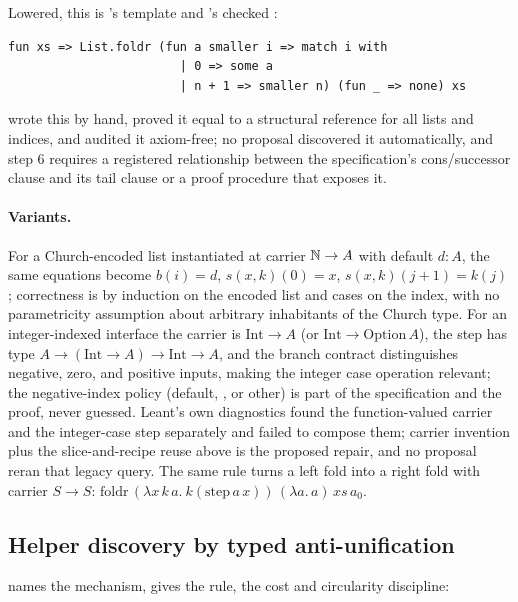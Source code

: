Lowered, this is 's template and 's checked :
\begin{lstlisting}
fun xs => List.foldr (fun a smaller i => match i with
                        | 0 => some a
                        | n + 1 => smaller n) (fun _ => none) xs
\end{lstlisting}
 wrote this by hand, proved it equal to a structural reference for all lists and indices, and audited it axiom-free; no proposal discovered it automatically, and step 6 requires a registered relationship between the specification's cons/successor clause and its tail clause or a proof procedure that exposes it.

\paragraph{Variants.} For a Church-encoded list instantiated at carrier $\mathbb{N} \to A$ with default $d : A$, the same equations become $b(i) = d$, $s(x, k)(0) = x$, $s(x, k)(j+1) = k(j)$; correctness is by induction on the encoded list and cases on the index, with no parametricity assumption about arbitrary inhabitants of the Church type. For an integer-indexed interface the carrier is $\mathrm{Int} \to A$ (or $\mathrm{Int} \to \mathrm{Option}\,A$), the step has type $A \to (\mathrm{Int} \to A) \to \mathrm{Int} \to A$, and the branch contract distinguishes negative, zero, and positive inputs, making the integer case operation relevant; the negative-index policy (default, , or other) is part of the specification and the proof, never guessed. Leant's own diagnostics found the function-valued carrier and the integer-case step separately and failed to compose them; carrier invention plus the slice-and-recipe reuse above is the proposed repair, and no proposal reran that legacy query. The same rule turns a left fold into a right fold with carrier $S \to S$: $\mathrm{foldr}\,(\lambda x\,k\,a.\ k(\mathrm{step}\,a\,x))\,(\lambda a.\,a)\,xs\,a_0$.

\subsection{Helper discovery by typed anti-unification}\label{alg:helpers}

 names the mechanism,  gives the rule,  the cost and circularity discipline:

